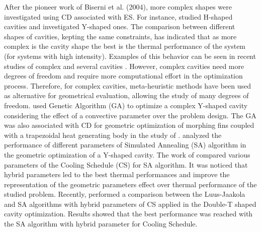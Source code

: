 \documentclass[12pt,fleqn]{article}
\begin{document}
After the pioneer work of Biserni et al. (2004), more complex shapes were investigated using CD associated with ES. For instance, \citep{Biserni2007} studied H-shaped cavities and \citep{Lorenzini2011} investigated Y-shaped ones. The comparison between different shapes of cavities, kepting the same constraints, has indicated that as more complex is the cavity shape the best is the thermal performance of the system (for systems with high intensity). Examples of this behavior can be seen in recent studies of complex and several cavities \citep{Xie2010,Lorenzini2012,Lorenzini2014}. However, complex cavities need more degrees of freedom and require more computational effort in the optimization process. Therefore, for complex cavities, meta-heuristic methods have been used as alternative for geometrical evaluation, allowing the study of many degrees of freedom. \cite{Lorenzini2014} used Genetic Algorithm (GA) to optimize a complex Y-shaped cavity considering the effect of a convective parameter over the problem design. The GA was also associated with CD for geometric optimization of morphing fins coupled with a trapezoidal heat generating body in the study of \cite{Biserni2017}. \cite{Gonzales2015a} analyzed the performance of different parameters of Simulated Annealing (SA) algorithm in the geometric optimization of a Y-shaped cavity. The work of \cite{Gonzales2015a} compared various parameters of the Cooling Schedule (CS) for SA algorithm. It was noticed that hybrid parameters led to the best thermal performances and improve the representation of the geometric parameters effect over thermal performance of the studied problem. Recently, \cite{Gonzales2017} performed a comparison between the Luus-Jaakola and SA algorithms with hybrid parameters of CS applied in the Double-T shaped cavity optimization. Results showed that the best performance was reached with the SA algorithm with hybrid parameter for Cooling Schedule.
\end{document}
